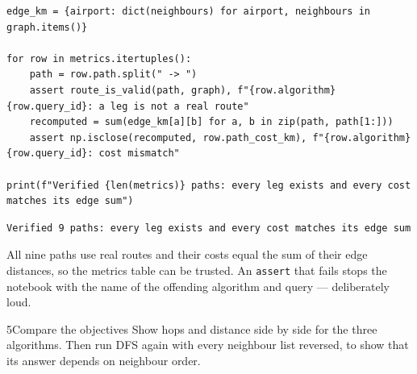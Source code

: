 \begin{labanswer}
\begin{lstlisting}[style=utppython]
edge_km = {airport: dict(neighbours) for airport, neighbours in graph.items()}

for row in metrics.itertuples():
    path = row.path.split(" -> ")
    assert route_is_valid(path, graph), f"{row.algorithm} {row.query_id}: a leg is not a real route"
    recomputed = sum(edge_km[a][b] for a, b in zip(path, path[1:]))
    assert np.isclose(recomputed, row.path_cost_km), f"{row.algorithm} {row.query_id}: cost mismatch"

print(f"Verified {len(metrics)} paths: every leg exists and every cost matches its edge sum")
\end{lstlisting}
\expectedoutput
\begin{lstlisting}[style=utpterminal]
Verified 9 paths: every leg exists and every cost matches its edge sum
\end{lstlisting}
All nine paths use real routes and their costs equal the sum of their edge distances, so the metrics table can be trusted. An \texttt{assert} that fails stops the notebook with the name of the offending algorithm and query --- deliberately loud.
\end{labanswer}

\begin{labquestion}{5}{Compare the objectives}
Show hops and distance side by side for the three algorithms. Then run DFS again with every neighbour list reversed, to show that its answer depends on neighbour order.
\end{labquestion}


